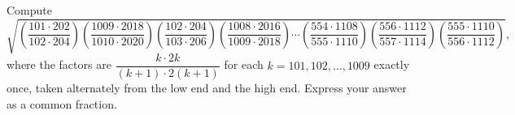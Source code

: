 Compute
\[\sqrt{\left(\dfrac{101\cdot202}{102\cdot204}\right)\left(\dfrac{1009\cdot2018}{1010\cdot2020}\right)\left(\dfrac{102\cdot204}{103\cdot206}\right)\left(\dfrac{1008\cdot2016}{1009\cdot2018}\right)\cdots\left(\dfrac{554\cdot1108}{555\cdot1110}\right)\left(\dfrac{556\cdot1112}{557\cdot1114}\right)\left(\dfrac{555\cdot1110}{556\cdot1112}\right)},\]
where the factors are $\dfrac{k\cdot2k}{(k+1)\cdot2(k+1)}$ for each $k=101,102,\dots,1009$ exactly once, taken alternately from the low end and the high end. Express your answer as a common fraction.
